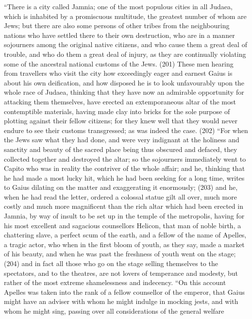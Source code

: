 ``There is a city called Jamnia; one of the most populous cities in all Judaea, which is inhabited by a
promiscuous multitude, the greatest number of whom are Jews; but there are also some persons
of other tribes from the neighbouring nations who have settled there to their own destruction, who
are in a manner sojourners among the original native citizens, and who cause them a great deal of
trouble, and who do them a great deal of injury, as they are continually violating some of the
ancestral national customs of the Jews. (201) These men hearing from travellers who visit the city
how exceedingly eager and earnest Gaius is about his own deification, and how disposed he is to
look unfavourably upon the whole race of Judaea, thinking that they have now an admirable
opportunity for attacking them themselves, have erected an extemporaneous altar of the most
contemptible materials, having made clay into bricks for the sole purpose of plotting against their
fellow citizens; for they knew well that they would never endure to see their customs transgressed;
as was indeed the case. (202) ``For when the Jews saw what they had done, and were very
indignant at the holiness and sanctity and beauty of the sacred place being thus obscured and
defaced, they collected together and destroyed the altar; so the sojourners immediately went to
Capito who was in reality the contriver of the whole affair; and he, thinking that he had made a most
lucky hit, which he had been seeking for a long time, writes to Gaius dilating on the matter and
exaggerating it enormously; (203) and he, when he had read the letter, ordered a colossal statue
gilt all over, much more costly and much more magnificent than the rich altar which had been
erected in Jamnia, by way of insult to be set up in the temple of the metropolis, having for his most
excellent and sagacious counsellors Helicon, that man of noble birth, a chattering slave, a perfect
scum of the earth, and a fellow of the name of Apelles, a tragic actor, who when in the first bloom
of youth, as they say, made a market of his beauty, and when he was past the freshness of youth
went on the stage; (204) and in fact all those who go on the stage selling themselves to the
spectators, and to the theatres, are not lovers of temperance and modesty, but rather of the most
extreme shamelessness and indecency. ``On this account Apelles was taken into the rank of a
fellow counsellor of the emperor, that Gaius might have an adviser with whom he might indulge in
mocking jests, and with whom he might sing, passing over all considerations of the general welfare
